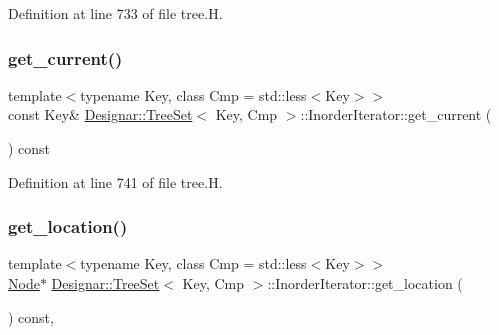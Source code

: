Definition at line 733 of file tree.\+H.

\mbox{\label{class_designar_1_1_tree_set_1_1_inorder_iterator_aad3ec85d58308071d6589fdbb258bdf6}} 
\subsubsection{\texorpdfstring{get\+\_\+current()}{get\_current()}\hspace{0.1cm}{\footnotesize\ttfamily [2/2]}}
{\footnotesize\ttfamily template$<$typename Key, class Cmp = std\+::less$<$\+Key$>$$>$ \\
const Key\& \hyperlink{class_designar_1_1_tree_set}{Designar\+::\+Tree\+Set}$<$ Key, Cmp $>$\+::Inorder\+Iterator\+::get\+\_\+current (\begin{DoxyParamCaption}{ }\end{DoxyParamCaption}) const\hspace{0.3cm}{\ttfamily [inline]}}



Definition at line 741 of file tree.\+H.

\mbox{\label{class_designar_1_1_tree_set_1_1_inorder_iterator_a06e9a4e3d4d834c250932e3d77190b1f}} 
\subsubsection{\texorpdfstring{get\+\_\+location()}{get\_location()}}
{\footnotesize\ttfamily template$<$typename Key, class Cmp = std\+::less$<$\+Key$>$$>$ \\
\hyperlink{class_designar_1_1_tree_set_a7409a9c1545c0e9e2fd6b84120713c99}{Node}$\ast$ \hyperlink{class_designar_1_1_tree_set}{Designar\+::\+Tree\+Set}$<$ Key, Cmp $>$\+::Inorder\+Iterator\+::get\+\_\+location (\begin{DoxyParamCaption}{ }\end{DoxyParamCaption}) const\hspace{0.3cm}{\ttfamily [inline]}, {\ttfamily [protected]}}



